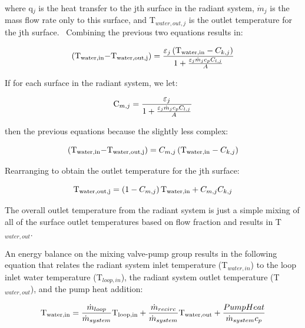 {where q\(_{j}\) is the heat transfer to the jth surface in the radiant system, \(\dot{m}_{j}\) is the mass flow rate only to this surface, and T\(_{water,out,j}\) is the outlet temperature for the jth surface.~ Combining the previous two equations results in:

\begin{equation}
{\rm{(}}{{\rm{T}}_{{\rm{water,in}}}}{\rm{  -  }}{{\rm{T}}_{{\rm{water,out,j}}}}{\rm{)}} = \frac{{{\varepsilon_j}\left( {{{\rm{T}}_{{\rm{water,in}}}} - {C_{k,j}}} \right)}}{{1 + \frac{{{\varepsilon_j}{{\dot m}_j}{c_p}{C_{l,j}}}}{A}}}
\end{equation}

If for each surface in the radiant system, we let:

\begin{equation}
{{\rm{C}}_{m,j}} = \frac{{{\varepsilon_j}}}{{1 + \frac{{{\varepsilon_j}{{\dot m}_j}{c_p}{C_{l,j}}}}{A}}}
\end{equation}

then the previous equations because the slightly less complex:

\begin{equation}
{\rm{(}}{{\rm{T}}_{{\rm{water,in}}}}{\rm{  -  }}{{\rm{T}}_{{\rm{water,out,j}}}}{\rm{)}} = {C_{m,j}}\left( {{{\rm{T}}_{{\rm{water,in}}}} - {C_{k,j}}} \right)
\end{equation}

Rearranging to obtain the outlet temperature for the jth surface:

\begin{equation}
{{\rm{T}}_{{\rm{water,out,j}}}} = \left( {1 - {C_{m,j}}} \right){{\rm{T}}_{{\rm{water,in}}}} + {C_{m,j}}{C_{k,j}}
\end{equation}

The overall outlet temperature from the radiant system is just a simple mixing of all of the surface outlet temperatures based on flow fraction and results in T\(_{water,out}\).

An energy balance on the mixing valve-pump group results in the following equation that relates the radiant system inlet temperature (T\(_{water,in}\)) to the loop inlet water temperature (T\(_{loop,in}\)), the radiant system outlet temperature (T\(_{water,out}\)), and the pump heat addition:

\begin{equation}
{{\rm{T}}_{{\rm{water,in}}}} = \frac{{{{\dot m}_{loop}}}}{{{{\dot m}_{system}}}}{{\rm{T}}_{{\rm{loop,in}}}} + \frac{{{{\dot m}_{recirc}}}}{{{{\dot m}_{system}}}}{{\rm{T}}_{{\rm{water,out}}}} + \frac{{PumpHeat}}{{{{\dot m}_{system}}{c_p}}}
\end{equation}

}
